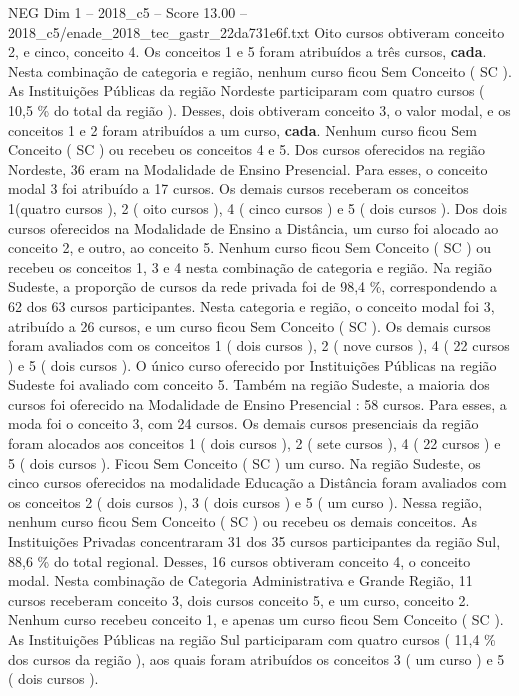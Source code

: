 \begin{textsample}{NEG Dim 1 – 2018\_c5 – Score 13.00 – 2018\_c5/enade\_2018\_tec\_gastr\_22da731e6f.txt}
Oito cursos obtiveram conceito 2, e cinco, conceito 4.
Os conceitos 1 e 5 foram atribuídos a três cursos, \textbf{cada}.
Nesta combinação de categoria e região, nenhum curso ficou Sem Conceito ( SC ).
As Instituições Públicas da região Nordeste participaram com quatro cursos ( 10,5 \% do total da região ).
Desses, dois obtiveram conceito 3, o valor modal, e os conceitos 1 e 2 foram atribuídos a um curso, \textbf{cada}.
Nenhum curso ficou Sem Conceito ( SC ) ou recebeu os conceitos 4 e 5.
Dos cursos oferecidos na região Nordeste, 36 eram na Modalidade de Ensino Presencial.
Para esses, o conceito modal 3 foi atribuído a 17 cursos.
Os demais cursos receberam os conceitos 1(quatro cursos ), 2 ( oito cursos ), 4 ( cinco cursos ) e 5 ( dois cursos ).
Dos dois cursos oferecidos na Modalidade de Ensino a Distância, um curso foi alocado ao conceito 2, e outro, ao conceito 5.
Nenhum curso ficou Sem Conceito ( SC ) ou recebeu os conceitos 1, 3 e 4 nesta combinação de categoria e região.
Na região Sudeste, a proporção de cursos da rede privada foi de 98,4 \%, correspondendo a 62 dos 63 cursos participantes.
Nesta categoria e região, o conceito modal foi 3, atribuído a 26 cursos, e um curso ficou Sem Conceito ( SC ).
Os demais cursos foram avaliados com os conceitos 1 ( dois cursos ), 2 ( nove cursos ), 4 ( 22 cursos ) e 5 ( dois cursos ).
O único curso oferecido por Instituições Públicas na região Sudeste foi avaliado com conceito 5.
Também na região Sudeste, a maioria dos cursos foi oferecido na Modalidade de Ensino Presencial : 58 cursos.
Para esses, a moda foi o conceito 3, com 24 cursos.
Os demais cursos presenciais da região foram alocados aos conceitos 1 ( dois cursos ), 2 ( sete cursos ), 4 ( 22 cursos ) e 5 ( dois cursos ).
Ficou Sem Conceito ( SC ) um curso.
Na região Sudeste, os cinco cursos oferecidos na modalidade Educação a Distância foram avaliados com os conceitos 2 ( dois cursos ), 3 ( dois cursos ) e 5 ( um curso ).
Nessa região, nenhum curso ficou Sem Conceito ( SC ) ou recebeu os demais conceitos.
As Instituições Privadas concentraram 31 dos 35 cursos participantes da região Sul, 88,6 \% do total regional.
Desses, 16 cursos obtiveram conceito 4, o conceito modal.
Nesta combinação de Categoria Administrativa e Grande Região, 11 cursos receberam conceito 3, dois cursos conceito 5, e um curso, conceito 2.
Nenhum curso recebeu conceito 1, e apenas um curso ficou Sem Conceito ( SC ).
As Instituições Públicas na região Sul participaram com quatro cursos ( 11,4 \% dos cursos da região ), aos quais foram atribuídos os conceitos 3 ( um curso ) e 5 ( dois cursos ).

\end{textsample}
